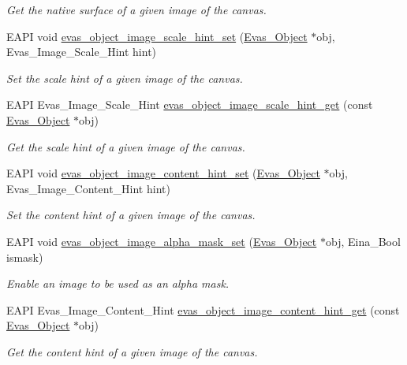 \begin{DoxyCompactItemize}
\begin{DoxyCompactList}\small\item\em Get the native surface of a given image of the canvas. \item\end{DoxyCompactList}\item 
EAPI void \hyperlink{group__Evas__Object__Image_gad13d32b74c2cd82c95b85fa9640ae529}{evas\_\-object\_\-image\_\-scale\_\-hint\_\-set} (\hyperlink{group__Evas__Object__Group_ga9e19e6dd1f517a0ba437c0114d3e7c97}{Evas\_\-Object} $\ast$obj, Evas\_\-Image\_\-Scale\_\-Hint hint)
\begin{DoxyCompactList}\small\item\em Set the scale hint of a given image of the canvas. \item\end{DoxyCompactList}\item 
EAPI Evas\_\-Image\_\-Scale\_\-Hint \hyperlink{group__Evas__Object__Image_ga8cce0086819196768915e5f2c2ed0cb2}{evas\_\-object\_\-image\_\-scale\_\-hint\_\-get} (const \hyperlink{group__Evas__Object__Group_ga9e19e6dd1f517a0ba437c0114d3e7c97}{Evas\_\-Object} $\ast$obj)
\begin{DoxyCompactList}\small\item\em Get the scale hint of a given image of the canvas. \item\end{DoxyCompactList}\item 
EAPI void \hyperlink{group__Evas__Object__Image_gaf6cc0faf39773e12eb496116afd67c6f}{evas\_\-object\_\-image\_\-content\_\-hint\_\-set} (\hyperlink{group__Evas__Object__Group_ga9e19e6dd1f517a0ba437c0114d3e7c97}{Evas\_\-Object} $\ast$obj, Evas\_\-Image\_\-Content\_\-Hint hint)
\begin{DoxyCompactList}\small\item\em Set the content hint of a given image of the canvas. \item\end{DoxyCompactList}\item 
EAPI void \hyperlink{group__Evas__Object__Image_ga154d8315842f4602878704951705e6cb}{evas\_\-object\_\-image\_\-alpha\_\-mask\_\-set} (\hyperlink{group__Evas__Object__Group_ga9e19e6dd1f517a0ba437c0114d3e7c97}{Evas\_\-Object} $\ast$obj, Eina\_\-Bool ismask)
\begin{DoxyCompactList}\small\item\em Enable an image to be used as an alpha mask. \item\end{DoxyCompactList}\item 
EAPI Evas\_\-Image\_\-Content\_\-Hint \hyperlink{group__Evas__Object__Image_ga28881040682dbbf00937948124e9f3fb}{evas\_\-object\_\-image\_\-content\_\-hint\_\-get} (const \hyperlink{group__Evas__Object__Group_ga9e19e6dd1f517a0ba437c0114d3e7c97}{Evas\_\-Object} $\ast$obj)
\begin{DoxyCompactList}\small\item\em Get the content hint of a given image of the canvas. \item\end{DoxyCompactList}\end{DoxyCompactItemize}



